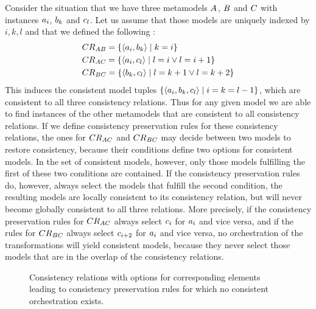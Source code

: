 Consider the situation that we have three metamodels $\metamodel{A}{}$, $\metamodel{B}{}$ and $\metamodel{C}{}$ with instances $\model{a}{i}$, $\model{b}{k}$ and $\model{c}{l}$.
Let us assume that those models are uniquely indexed by $i,k,l$ and that we defined the following \modellevelconsistencyrelations:
\begin{align*}
    &
    \consistencyrelation{CR}{AB} = \setted{\tupled{\model{a}{i}, \model{b}{k}} \mid k = i} \\
    &
    \consistencyrelation{CR}{AC} = \setted{\tupled{\model{a}{i}, \model{c}{l}} \mid l = i \lor l = i+1} \\
    &
    \consistencyrelation{CR}{BC} = \setted{\tupled{\model{b}{k}, \model{c}{l}} \mid l = k+1 \lor l = k+2}
\end{align*}
This induces the consistent model tuples $\setted{\tupled{\model{a}{i}, \model{b}{k}, \model{c}{l}} \mid  i = k = l-1}$, which are consistent to all three consistency relations.
Thus for any given model we are able to find instances of the other metamodels that are consistent to all consistency relations.
If we define consistency preservation rules for these consistency relations, the ones for $\consistencyrelation{CR}{AC}$ and $\consistencyrelation{CR}{BC}$ may decide between two models to restore consistency, because their conditions define two options for consistent models.
In the set of consistent models, however, only those models fulfilling the first of these two conditions are contained.
If the consistency preservation rules do, however, always select the models that fulfill the second condition, the resulting models are locally consistent to its consistency relation, but will never become globally consistent to all three relations.
More precisely, if the consistency preservation rules for $\consistencyrelation{CR}{AC}$ always select $\model{c}{i}$ for $\model{a}{i}$ and vice versa, and if the rules for $\consistencyrelation{CR}{BC}$ always select $\model{c}{i+2}$ for $\model{a}{i}$ and vice versa, no orchestration of the transformations will yield consistent models, because they never select those models that are in the overlap of the consistency relations.

\begin{figure}
    \centering
    
    \caption[Consistency preservation rules without orchestration]{Consistency relations with options for corresponding elements leading to consistency preservation rules for which no consistent orchestration exists.}
    \label{fig:orchestration:no_orchestration}
\end{figure}

